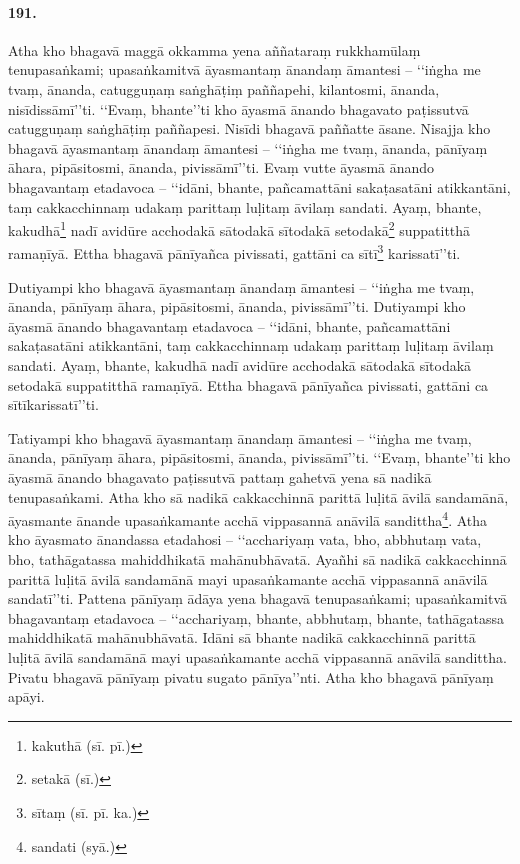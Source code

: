 \paragraph{191.} Atha kho bhagavā maggā okkamma yena aññataraṃ rukkhamūlaṃ tenupasaṅkami; upasaṅkamitvā āyasmantaṃ ānandaṃ āmantesi – ‘‘iṅgha me tvaṃ, ānanda, catugguṇaṃ saṅghāṭiṃ paññapehi, kilantosmi, ānanda, nisīdissāmī’’ti. ‘‘Evaṃ, bhante’’ti kho āyasmā ānando bhagavato paṭissutvā catugguṇaṃ saṅghāṭiṃ paññapesi. Nisīdi bhagavā paññatte āsane. Nisajja kho bhagavā āyasmantaṃ ānandaṃ āmantesi – ‘‘iṅgha me tvaṃ, ānanda, pānīyaṃ āhara, pipāsitosmi, ānanda, pivissāmī’’ti. Evaṃ vutte āyasmā ānando bhagavantaṃ etadavoca – ‘‘idāni, bhante, pañcamattāni sakaṭasatāni atikkantāni, taṃ cakkacchinnaṃ udakaṃ parittaṃ luḷitaṃ āvilaṃ sandati. Ayaṃ, bhante, kakudhā\footnote{kakuthā (sī. pī.)} nadī avidūre acchodakā sātodakā sītodakā setodakā\footnote{setakā (sī.)} suppatitthā ramaṇīyā. Ettha bhagavā pānīyañca pivissati, gattāni ca sītī\footnote{sītaṃ (sī. pī. ka.)} karissatī’’ti.

Dutiyampi kho bhagavā āyasmantaṃ ānandaṃ āmantesi – ‘‘iṅgha me tvaṃ, ānanda, pānīyaṃ āhara, pipāsitosmi, ānanda, pivissāmī’’ti. Dutiyampi kho āyasmā ānando bhagavantaṃ etadavoca – ‘‘idāni, bhante, pañcamattāni sakaṭasatāni atikkantāni, taṃ cakkacchinnaṃ udakaṃ parittaṃ luḷitaṃ āvilaṃ sandati. Ayaṃ, bhante, kakudhā nadī avidūre acchodakā sātodakā sītodakā setodakā suppatitthā ramaṇīyā. Ettha bhagavā pānīyañca pivissati, gattāni ca sītīkarissatī’’ti.

Tatiyampi kho bhagavā āyasmantaṃ ānandaṃ āmantesi – ‘‘iṅgha me tvaṃ, ānanda, pānīyaṃ āhara, pipāsitosmi, ānanda, pivissāmī’’ti. ‘‘Evaṃ, bhante’’ti kho āyasmā ānando bhagavato paṭissutvā pattaṃ gahetvā yena sā nadikā tenupasaṅkami. Atha kho sā nadikā cakkacchinnā parittā luḷitā āvilā sandamānā, āyasmante ānande upasaṅkamante acchā vippasannā anāvilā sandittha\footnote{sandati (syā.)}. Atha kho āyasmato ānandassa etadahosi – ‘‘acchariyaṃ vata, bho, abbhutaṃ vata, bho, tathāgatassa mahiddhikatā mahānubhāvatā. Ayañhi sā nadikā cakkacchinnā parittā luḷitā āvilā sandamānā mayi upasaṅkamante acchā vippasannā anāvilā sandatī’’ti. Pattena pānīyaṃ ādāya yena bhagavā tenupasaṅkami; upasaṅkamitvā bhagavantaṃ etadavoca – ‘‘acchariyaṃ, bhante, abbhutaṃ, bhante, tathāgatassa mahiddhikatā mahānubhāvatā. Idāni sā bhante nadikā cakkacchinnā parittā luḷitā āvilā sandamānā mayi upasaṅkamante acchā vippasannā anāvilā sandittha. Pivatu bhagavā pānīyaṃ pivatu sugato pānīya’’nti. Atha kho bhagavā pānīyaṃ apāyi.

